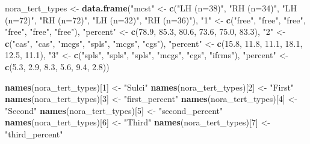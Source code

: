 \documentclass[
]{article}
\newenvironment{Shaded}{\begin{snugshade}}{\end{snugshade}}
\newcommand{\DecValTok}[1]{\textcolor[rgb]{0.00,0.00,0.81}{#1}}
\newcommand{\FloatTok}[1]{\textcolor[rgb]{0.00,0.00,0.81}{#1}}
\newcommand{\KeywordTok}[1]{\textcolor[rgb]{0.13,0.29,0.53}{\textbf{#1}}}
\newcommand{\NormalTok}[1]{#1}
\newcommand{\StringTok}[1]{\textcolor[rgb]{0.31,0.60,0.02}{#1}}
\begin{document}
\begin{Shaded}
\begin{Highlighting}[]
\NormalTok{nora_tert_types <-}\StringTok{ }\KeywordTok{data.frame}\NormalTok{(}\StringTok{"mcst"}\NormalTok{ <-}\StringTok{ }\KeywordTok{c}\NormalTok{(}\StringTok{"LH (n=38)"}\NormalTok{, }\StringTok{"RH (n=34)"}\NormalTok{, }\StringTok{"LH (n=72)"}\NormalTok{, }\StringTok{"RH (n=72)"}\NormalTok{, }\StringTok{"LH (n=32)"}\NormalTok{, }\StringTok{"RH (n=36)"}\NormalTok{),}
                              \StringTok{"1"}\NormalTok{ <-}\StringTok{ }\KeywordTok{c}\NormalTok{(}\StringTok{"free"}\NormalTok{, }\StringTok{"free"}\NormalTok{, }\StringTok{"free"}\NormalTok{, }\StringTok{"free"}\NormalTok{, }\StringTok{"free"}\NormalTok{, }\StringTok{"free"}\NormalTok{),}
                              \StringTok{"percent"}\NormalTok{ <-}\StringTok{ }\KeywordTok{c}\NormalTok{(}\FloatTok{78.9}\NormalTok{, }\FloatTok{85.3}\NormalTok{, }\FloatTok{80.6}\NormalTok{, }\FloatTok{73.6}\NormalTok{, }\FloatTok{75.0}\NormalTok{, }\FloatTok{83.3}\NormalTok{),}
                              \StringTok{"2"}\NormalTok{ <-}\StringTok{ }\KeywordTok{c}\NormalTok{(}\StringTok{"cas"}\NormalTok{, }\StringTok{"cas"}\NormalTok{, }\StringTok{"mcgs"}\NormalTok{, }\StringTok{"spls"}\NormalTok{, }\StringTok{"mcgs"}\NormalTok{, }\StringTok{"cgs"}\NormalTok{),}
                              \StringTok{"percent"}\NormalTok{ <-}\StringTok{ }\KeywordTok{c}\NormalTok{(}\FloatTok{15.8}\NormalTok{, }\FloatTok{11.8}\NormalTok{, }\FloatTok{11.1}\NormalTok{, }\FloatTok{18.1}\NormalTok{, }\FloatTok{12.5}\NormalTok{, }\FloatTok{11.1}\NormalTok{),}
                              \StringTok{"3"}\NormalTok{ <-}\StringTok{ }\KeywordTok{c}\NormalTok{(}\StringTok{"spls"}\NormalTok{, }\StringTok{"spls"}\NormalTok{, }\StringTok{"spls"}\NormalTok{, }\StringTok{"mcgs"}\NormalTok{, }\StringTok{"cgs"}\NormalTok{, }\StringTok{"ifrms"}\NormalTok{),}
                              \StringTok{"percent"}\NormalTok{ <-}\StringTok{ }\KeywordTok{c}\NormalTok{(}\FloatTok{5.3}\NormalTok{, }\FloatTok{2.9}\NormalTok{, }\FloatTok{8.3}\NormalTok{, }\FloatTok{5.6}\NormalTok{, }\FloatTok{9.4}\NormalTok{, }\FloatTok{2.8}\NormalTok{))}

\KeywordTok{names}\NormalTok{(nora_tert_types)[}\DecValTok{1}\NormalTok{] <-}\StringTok{ "Sulci"}
\KeywordTok{names}\NormalTok{(nora_tert_types)[}\DecValTok{2}\NormalTok{] <-}\StringTok{ "First"}
\KeywordTok{names}\NormalTok{(nora_tert_types)[}\DecValTok{3}\NormalTok{] <-}\StringTok{ "first_percent"}
\KeywordTok{names}\NormalTok{(nora_tert_types)[}\DecValTok{4}\NormalTok{] <-}\StringTok{ "Second"}
\KeywordTok{names}\NormalTok{(nora_tert_types)[}\DecValTok{5}\NormalTok{] <-}\StringTok{ "second_percent"}
\KeywordTok{names}\NormalTok{(nora_tert_types)[}\DecValTok{6}\NormalTok{] <-}\StringTok{ "Third"}
\KeywordTok{names}\NormalTok{(nora_tert_types)[}\DecValTok{7}\NormalTok{] <-}\StringTok{ "third_percent"}


\end{Highlighting}
\end{Shaded}
\end{document}
